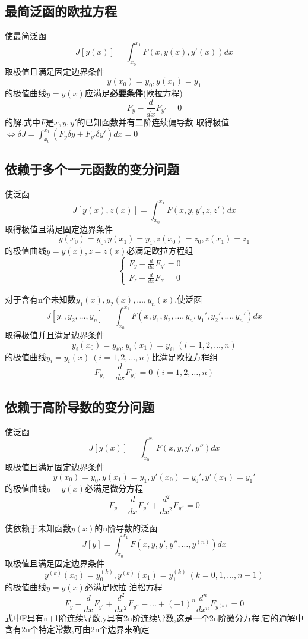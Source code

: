 \documentclass{article}
\begin{document}
\subsection{最简泛函的欧拉方程}
\begin{theorem}
使最简泛函
$$J[y(x)]=\int_{x_0}^{x_1}F(x,y(x),y'(x))dx$$
取极值且满足固定边界条件
$$
y(x_0)=y_0,y(x_1)=y_1
$$
的极值曲线$y=y(x)$应满足\textbf{必要条件}(欧拉方程)
$$
F_y - \frac{d}{dx}F_{y'} =0
$$
的解,式中$F$是$x,y,y'$的已知函数并有二阶连续偏导数
取得极值 $\Leftrightarrow \delta J = \int_{x_0}^{x_1}(F_y \delta y + F_{y'} \delta y')dx=0$
\end{theorem}

\subsection{依赖于多个一元函数的变分问题}
\begin{theorem}
使泛函$$J[y(x),z(x)]=\int_{x_0}^{x_1}F(x,y,y',z,z')dx$$取得极值且满足固定边界条件
$$
y(x_0)=y_0,y(x_1)=y_1,z(x_0)=z_0,z(x_1)=z_1
$$
的极值曲线$y=y(x),z=z(x)$必满足欧拉方程组
$$
\left\{
  \begin{array}{ll}
    F_y - \frac{d}{dx}F_{y'}=0 & \\
    F_z - \frac{d}{dx}F_{z'}=0 &
  \end{array}
\right.
$$
\end{theorem}

\begin{corollary}
对于含有n个未知数$y_1(x),y_2(x) ,\ldots , y_n(x)$,使泛函
$$J[y_1,y_2 ,\ldots , y_n]=\int_{x_0}^{x_1}F(x,y_1,y_2 ,\ldots , y_n,y_1',y_2' ,\ldots , y_n')dx$$
取得极值并且满足边界条件
$$y_i(x_0)=y_{i0},y_i(x_1)=y_{i1} ~(i=1,2,\dots,n)$$
的极值曲线$y_i=y_i(x)~ (i=1,2,\dots,n)$比满足欧拉方程组
$$F_{y_i} -  \frac{d}{dx}F_{y_i'}=0 ~(i=1,2,\dots,n)$$
\end{corollary}

\subsection{依赖于高阶导数的变分问题}
\begin{theorem}
使泛函
$$J[y(x)]=\int_{x_0}^{x_1}F(x,y,y',y'')dx$$
取极值且满足固定边界条件
$$
y(x_0)=y_0,y(x_1)=y_1,y'(x_0)=y_0',y'(x_1)=y_1'
$$
的极值曲线$y=y(x)$必满足微分方程
$$F_y - \frac{d}{dx}F_y' + \frac{d^2}{dx^2}F_{y''} = 0 $$
\end{theorem}

\begin{corollary}
使依赖于未知函数$y(x)$的n阶导数的泛函
$$J[y]=\int_{x_0}^{x_1}F(x,y,y',y'', \ldots , y^{(n)})dx$$
取极值且满足固定边界条件
$$
y^{(k)}(x_0)=y_0^{(k)}, y^{(k)}(x_1)=y_1^{(k)} ~ (k= 0,1,\ldots , n-1)
$$
的极值曲线$y=y(x)$必满足欧拉-泊松方程
$$F_y - \frac{d}{dx}F_{y'} + \frac{d^2}{dx^2}F_{y''} - \dots + (-1)^{n}\frac{d^n}{dx^n}F_{y^{(n)}}=0  $$
式中F具有n+1阶连续导数,y具有2n阶连续导数,这是一个2n阶微分方程,它的通解中含有2n个特定常数,可由2n个边界来确定
\end{corollary}
\end{document}
